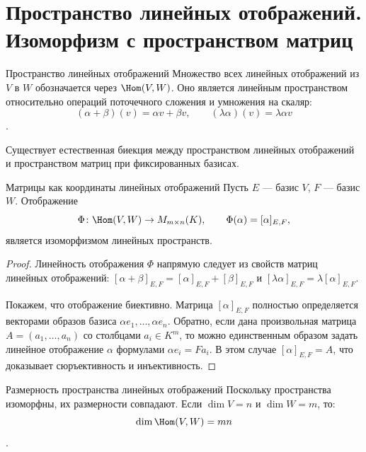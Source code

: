 
\section{Пространство линейных отображений. Изоморфизм с пространством матриц}

\begin{Definition}{Пространство линейных отображений}{}
	Множество всех линейных отображений из $V$ в $W$ обозначается через $\Hom(V,W)$. Оно является линейным пространством относительно операций поточечного сложения и умножения на скаляр:
	\[
	(\alpha+\beta)(v)=\alpha v+\beta v, \qquad (\lambda\alpha)(v)=\lambda\alpha v
	\].
\end{Definition}

Существует естественная биекция между пространством линейных отображений и пространством матриц при фиксированных базисах.

\begin{Theorem}{Матрицы как координаты линейных отображений}{}
	Пусть $E$ --- базис $V$, $F$ --- базис $W$. Отображение
	\[
	\Phi\colon \Hom(V,W)\to M_{m\times n}(K), \qquad \Phi(\alpha)=[\alpha]_{E,F},
	\]
	является изоморфизмом линейных пространств.
\end{Theorem}

\begin{proof}
	Линейность отображения $\Phi$ напрямую следует из свойств матриц линейных отображений: $[\alpha+\beta]_{E,F}=[\alpha]_{E,F}+[\beta]_{E,F}$ и $[\lambda\alpha]_{E,F}=\lambda[\alpha]_{E,F}$.

	Покажем, что отображение биективно. Матрица $[\alpha]_{E,F}$ полностью определяется векторами образов базиса $\alpha e_1,\ldots,\alpha e_n$. Обратно, если дана произвольная матрица $A=(a_1,\ldots,a_n)$ со столбцами $a_i\in K^m$, то можно единственным образом задать линейное отображение $\alpha$ формулами $\alpha e_i=Fa_i$. В этом случае $[\alpha]_{E,F}=A$, что доказывает сюръективность и инъективность.
\end{proof}

\begin{Corollary}{Размерность пространства линейных отображений}{}
	Поскольку пространства изоморфны, их размерности совпадают. Если $\dim V=n$ и $\dim W=m$, то:
	\[
	\dim \Hom(V,W)=mn
	\].
\end{Corollary}
